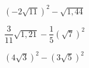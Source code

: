 \begin{class}[number=1]
\begin{listofex}[resume]
\begin{enumcols}[itemcolumns=3]
			\item \( (-2\sqrt{11})^2-\sqrt{1,44} \)
			\item \( \dfrac{3}{11}\sqrt{1,21}-\dfrac{1}{5}(\sqrt{7})^2 \)
			\item \( (4\sqrt{3})^2-(3\sqrt{5})^2 \)
		\end{enumcols}
	\end{listofex}
\end{class}
%
%
